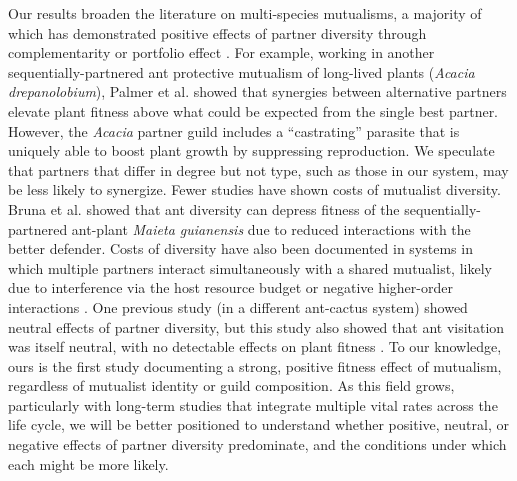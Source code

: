 \documentclass[11pt]{article}
\begin{document}
Our results broaden the literature on multi-species mutualisms, a majority of which has demonstrated positive effects of partner diversity through complementarity \citep{Yang2024,Hernandez2020,Larimer2014,Afkhami2016,Fehling2022,Gustafson2005,McKeon2012,Palmer2010,Afkhami2021,Stachowicz2005} or portfolio effect \citep{Stevens2024,Thibaut2012,rogers2014,Lazaro2022}. 
For example, working in another sequentially-partnered ant protective mutualism of long-lived plants (\textit{Acacia drepanolobium}), Palmer et al. \citeyear{Palmer2010} showed that synergies between alternative partners elevate plant fitness above what could be expected from the single best partner. 
However, the \textit{Acacia} partner guild includes a ``castrating'' parasite that is uniquely able to boost plant growth by suppressing reproduction. 
We speculate that partners that differ in degree but not type, such as those in our system, may be less likely to synergize. 
Fewer studies have shown costs of mutualist diversity. 
Bruna et al. \citeyear{Bruna2014} showed that ant diversity can depress fitness of the sequentially-partnered ant-plant \textit{Maieta guianensis} due to reduced interactions with the better defender. 
Costs of diversity have also been documented in systems in which multiple partners interact simultaneously with a shared mutualist, likely due to interference via the host resource budget \citep{Keller2018} or negative higher-order interactions \citep{Barrett2015}. 
One previous study (in a different ant-cactus system) showed neutral effects of partner diversity, but this study also showed that ant visitation was itself neutral, with no detectable effects on plant fitness \citep{Ford2015}. 
To our knowledge, ours is the first study documenting a strong, positive fitness effect of mutualism, regardless of mutualist identity or guild composition. 
As this field grows, particularly with long-term studies that integrate multiple vital rates across the life cycle, we will be better positioned to understand whether positive, neutral, or negative effects of partner diversity predominate, and the conditions under which each might be more likely. 
\end{document}
